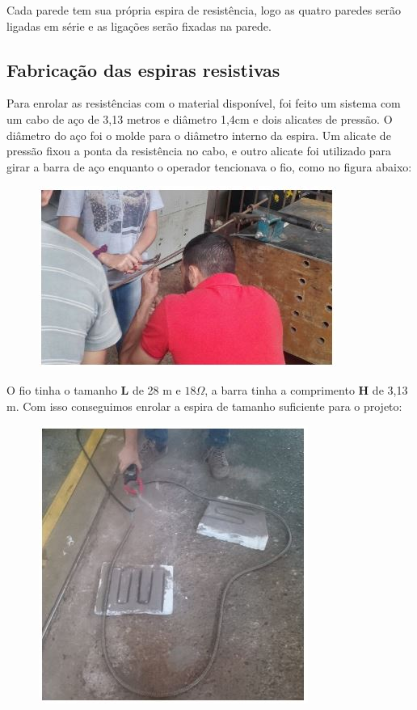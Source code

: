 Cada parede tem sua própria espira de resistência, logo as quatro paredes serão ligadas em série e as ligações serão fixadas na parede.

\subsection{Fabricação das espiras resistivas}
Para enrolar as resistências com o material disponível, foi feito um sistema com um cabo de aço de 3,13 metros e diâmetro 1,4cm e dois alicates de pressão. O diâmetro do aço foi o molde para o diâmetro interno da espira. Um alicate de pressão fixou a ponta da resistência no cabo, e outro alicate foi utilizado para girar a barra de aço enquanto o operador tencionava o fio, como no figura abaixo:
\begin{figure}[H]
	\centering
	\label{foto1}
	\includegraphics[keepaspectratio=true,scale=1.0]{figuras/alimentacao6.JPG}
\end{figure}

O fio tinha o tamanho \textbf{L} de 28 m e $18\Omega$, a barra tinha a comprimento \textbf{H} de 3,13 m. Com isso conseguimos enrolar a espira de tamanho suficiente para o projeto:
\begin{figure}[H]
	\centering
	\label{foto2}
	\includegraphics[keepaspectratio=true,scale=1.0]{figuras/alimentacao7.JPG}
\end{figure}

